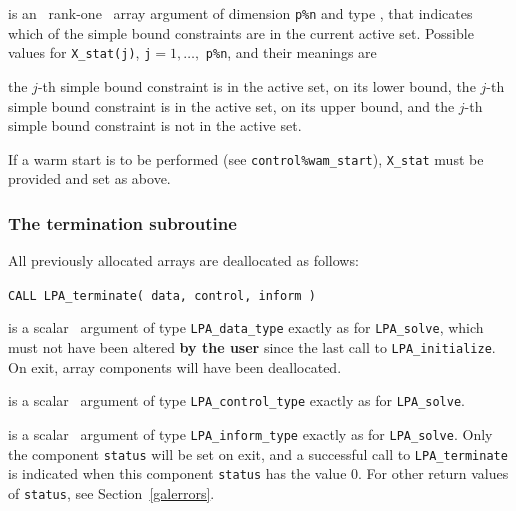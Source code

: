 \documentclass{galahad}
\newcommand{\packagename}{LPA}
\begin{document}
\begin{description}
 is an \optional\ rank-one \intentout\ array argument of
dimension {\tt p\%n}
and type \integer, that indicates which of the simple bound
constraints are in the current active set. Possible values for
{\tt X\_stat(j)}, {\tt j}$=1, \ldots ,$ {\tt p\%n}, and their meanings are
\begin{description}
 the $j$-th simple bound constraint
is in the active set, on its lower bound,
 the $j$-th simple bound constraint
is in the active set, on its upper bound, and
  the $j$-th simple bound constraint is not in the active set.
\end{description}
If a warm start is to be performed (see {\tt control\%wam\_start}),
{\tt X\_stat} must be provided and set as above.

\end{description}


\subsubsection{The  termination subroutine}
All previously allocated arrays are deallocated as follows:
\vspace*{1mm}

\hspace{8mm}
{\tt CALL \packagename\_terminate( data, control, inform )}

\vspace*{-3mm}
\begin{description}

 is a scalar \intentinout\ argument of type
{\tt \packagename\_data\_type}
exactly as for
{\tt \packagename\_solve},
which must not have been altered {\bf by the user} since the last call to
{\tt \packagename\_initialize}.
On exit, array components will have been deallocated.

 is a scalar \intentin\ argument of type
{\tt \packagename\_control\_type}
exactly as for
{\tt \packagename\_solve}.

 is a scalar \intentout\ argument of type
{\tt \packagename\_inform\_type}
exactly as for
{\tt \packagename\_solve}.
Only the component {\tt status} will be set on exit, and a
successful call to
{\tt \packagename\_terminate}
is indicated when this  component {\tt status} has the value 0.
For other return values of {\tt status}, see Section~\ref{galerrors}.

\end{description}
\end{document}
